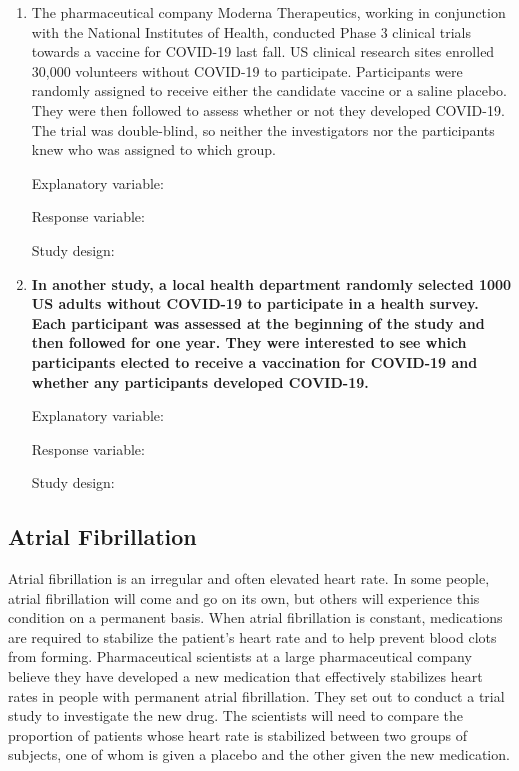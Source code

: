 \documentclass[
]{report}
\begin{document}
\begin{enumerate}
\def\labelenumi{\arabic{enumi}.}
\item
  The pharmaceutical company Moderna Therapeutics, working in conjunction with the National Institutes of Health, conducted Phase 3 clinical trials towards a vaccine for COVID-19 last fall. US clinical research sites enrolled 30,000 volunteers without COVID-19 to participate. Participants were randomly assigned to receive either the candidate vaccine or a saline placebo. They were then followed to assess whether or not they developed COVID-19. The trial was double-blind, so neither the investigators nor the participants knew who was assigned to which group.
  \vspace{0.1in}

  Explanatory variable:
  \vspace{0.25in}

  Response variable:
  \vspace{0.25in}

  Study design:
  \vspace{0.25in}
\item
  \textbf{In another study, a local health department randomly selected 1000 US adults without COVID-19 to participate in a health survey. Each participant was assessed at the beginning of the study and then followed for one year. They were interested to see which participants elected to receive a vaccination for COVID-19 and whether any participants developed COVID-19.}
  \vspace{0.1in}

  Explanatory variable:
  \vspace{0.25in}

  Response variable:
  \vspace{0.25in}

  Study design:
  \vspace{0.25in}
\end{enumerate}

\hypertarget{atrial-fibrillation}{%
\subsection{Atrial Fibrillation}\label{atrial-fibrillation}}

Atrial fibrillation is an irregular and often elevated heart rate. In some people, atrial fibrillation will come and go on its own, but others will experience this condition on a permanent basis. When atrial fibrillation is constant, medications are required to stabilize the patient's heart rate and to help prevent blood clots from forming. Pharmaceutical scientists at a large pharmaceutical company believe they have developed a new medication that effectively stabilizes heart rates in people with permanent atrial fibrillation. They set out to conduct a trial study to investigate the new drug. The scientists will need to compare the proportion of patients whose heart rate is stabilized between two groups of subjects, one of whom is given a placebo and the other given the new medication.
\end{document}
